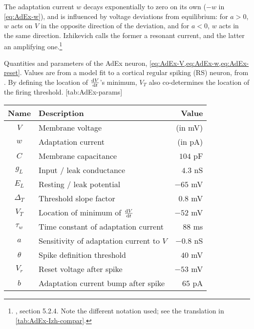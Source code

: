 The adaptation current $w$ decays exponentially to zero on its own ($-w$ in \cref{eq:AdEx-w}), and is influenced by voltage deviations from equilibrium: for $a > 0$, $w$ acts on $V$ in the opposite direction of the deviation, and for $a < 0$, $w$ acts in the same direction. Izhikevich calls the former a resonant current, and the latter an amplifying one.\footnote{\cite{Izhikevich2007DynamicalSystemsNeuroscience}, section 5.2.4. Note the different notation used; see the translation in \cref{tab:AdEx-Izh-compar}.}

\begin{table}[h]
    \vspace*{2em} %
    \begin{sidecaption}
        {Quantities and parameters of the AdEx neuron, \cref{eq:AdEx-V,eq:AdEx-w,eq:AdEx-reset}. Values are from a model fit to a cortical regular spiking (RS) neuron, from \cite{Naud2008FiringPatternsAdaptive}. By defining the location of $\frac{\mathrm{d}V}{\mathrm{d}t}$'s minimum, $V_T$ also co-determines the location of the firing threshold.}
        [tab:AdEx-params]
        \begin{tabular}{c l r}
            Name  & Description & Value \\
            \hline
            $V$  & Membrane voltage & (in mV) \\
            $w$   & Adaptation current & (in pA) \\
            $C$ & Membrane capacitance & $104$ pF \\
            $g_L$ & Input / leak conductance & $4.3$ nS \\
            $E_L$  & Resting / leak potential & $-65$ mV \\
            $Δ_T$  & Threshold slope factor & $0.8$ mV \\
            $V_T$  & Location of minimum of $\frac{\mathrm{d}V}{\mathrm{d}t}$ & $-52$ mV \\
            $τ_w$   & Time constant of adaptation current & $88$ ms \\
            $a$ & Sensitivity of adaptation current to $V$ & $-0.8$ nS \\
            $θ$ & Spike definition threshold & $40$ mV \\
            $V_r$  & Reset voltage after spike & $-53$ mV \\
            $b$ & Adaptation current bump after spike & $65$ pA
        \end{tabular}
    \end{sidecaption}
    \vspace*{1em}
\end{table}

